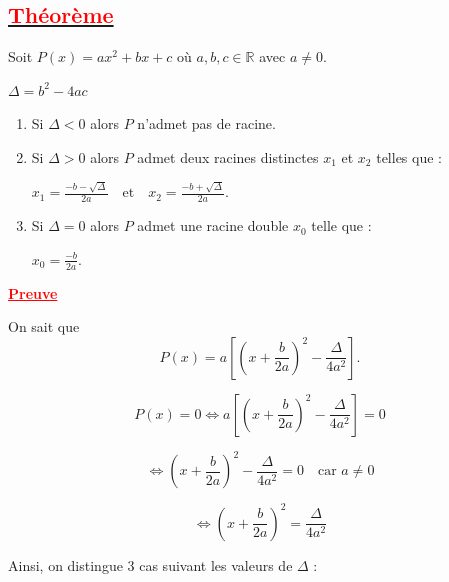 \documentclass[12pt,a4paper]{article}
\begin{document}
\subsection*{\underline{\textbf{\textcolor{red}{Théorème}}}}

\medskip

Soit 
\(
P(x)=ax^2+bx+c
\)
où $a,b,c\in\mathbb{R}$ avec $a\neq0$.

\(
\Delta=b^2-4ac
\)

\begin{enumerate}
\item[(i)] Si $\Delta<0$ alors $P$ n’admet pas de racine.

\item[(ii)] Si $\Delta>0$ alors $P$ admet deux racines distinctes $x_1$ et $x_2$ telles que :

\(
x_1=\frac{-b-\sqrt{\Delta}}{2a}
\quad \text{et} \quad
x_2=\frac{-b+\sqrt{\Delta}}{2a}.
\)

\item[(iii)] Si $\Delta=0$ alors $P$ admet une racine double $x_0$ telle que :

\(
x_0=\frac{-b}{2a}.
\)
\end{enumerate}
\bigskip
\textcolor{red}{\underline{\textbf{Preuve}}}

\medskip

On sait que
\[
P(x)=a\left[\left(x+\frac{b}{2a}\right)^2-\frac{\Delta}{4a^2}\right].
\]

\[
P(x)=0
\iff
a\left[\left(x+\frac{b}{2a}\right)^2-\frac{\Delta}{4a^2}\right]=0
\]

\[
\iff
\left(x+\frac{b}{2a}\right)^2-\frac{\Delta}{4a^2}=0
\quad \text{car } a\neq0
\]

\[
\iff
\left(x+\frac{b}{2a}\right)^2=\frac{\Delta}{4a^2}
\tag{$*$}
\]

Ainsi, on distingue 3 cas suivant les valeurs de $\Delta$ :
\end{document}
